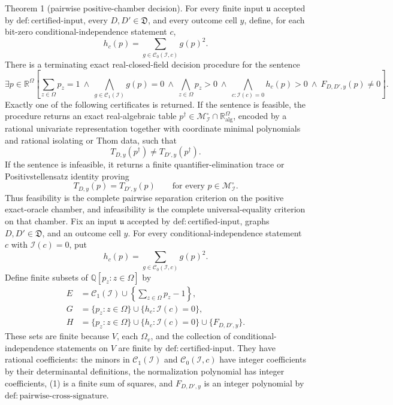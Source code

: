 Theorem 1 (pairwise positive-chamber decision).  For every finite input \(\mathfrak u\) accepted by \(\mathrm{def{:}certified\text{-}input}\), every \(D,D'\in\mathfrak D\), and every outcome cell \(y\), define, for each bit-zero conditional-independence statement \(c\),
\[
 h_c(p)=\sum_{g\in\mathcal C_0(\mathcal I,c)}g(p)^2.
\]
There is a terminating exact real-closed-field decision procedure for the sentence
\[
 \exists p\in\mathbb R^\Omega\left[
 \sum_{z\in\Omega}p_z=1
 \ \wedge\ 
 \bigwedge_{g\in\mathcal C_1(\mathcal I)}g(p)=0
 \ \wedge\ 
 \bigwedge_{z\in\Omega}p_z>0
 \ \wedge\ 
 \bigwedge_{c:\mathcal I(c)=0}h_c(p)>0
 \ \wedge\ 
 F_{D,D',y}(p)\neq0
 \right].
\]
Exactly one of the following certificates is returned.  If the sentence is feasible, the procedure returns an exact real-algebraic table \(p^\dagger\in\mathcal M_{\mathcal I}^{\circ}\cap\mathbb R_{\mathrm{alg}}^\Omega\), encoded by a rational univariate representation together with coordinate minimal polynomials and rational isolating or Thom data, such that
\[
 T_{D,y}(p^\dagger)\neq T_{D',y}(p^\dagger).
\]
If the sentence is infeasible, it returns a finite quantifier-elimination trace or Positivstellensatz identity proving
\[
 T_{D,y}(p)=T_{D',y}(p)
 \qquad\text{for every }p\in\mathcal M_{\mathcal I}^{\circ}.
\]
Thus feasibility is the complete pairwise separation criterion on the positive exact-oracle chamber, and infeasibility is the complete universal-equality criterion on that chamber.
Fix an input \(\mathfrak u\) accepted by \(\mathrm{def{:}certified\text{-}input}\), graphs \(D,D'\in\mathfrak D\), and an outcome cell \(y\).  For every conditional-independence statement \(c\) with \(\mathcal I(c)=0\), put
\[
 h_c(p)=\sum_{g\in\mathcal C_0(\mathcal I,c)}g(p)^2.
\tag{1}
\]
Define finite subsets of \(\mathbb Q[p_z:z\in\Omega]\) by
\[
 \begin{aligned}
 E&=\mathcal C_1(\mathcal I)\cup
 \left\{\sum_{z\in\Omega}p_z-1\right\},\\
 G&=\{p_z:z\in\Omega\}\cup
 \{h_c:\mathcal I(c)=0\},\\
 H&=\{p_z:z\in\Omega\}\cup
 \{h_c:\mathcal I(c)=0\}\cup\{F_{D,D',y}\}.
 \end{aligned}
\tag{2}
\]
These sets are finite because \(V\), each \(\Omega_v\), and the collection of conditional-independence statements on \(V\) are finite by \(\mathrm{def{:}certified\text{-}input}\).  They have rational coefficients: the minors in \(\mathcal C_1(\mathcal I)\) and \(\mathcal C_0(\mathcal I,c)\) have integer coefficients by their determinantal definitions, the normalization polynomial has integer coefficients, (1) is a finite sum of squares, and \(F_{D,D',y}\) is an integer polynomial by \(\mathrm{def{:}pairwise\text{-}cross\text{-}signature}\).


